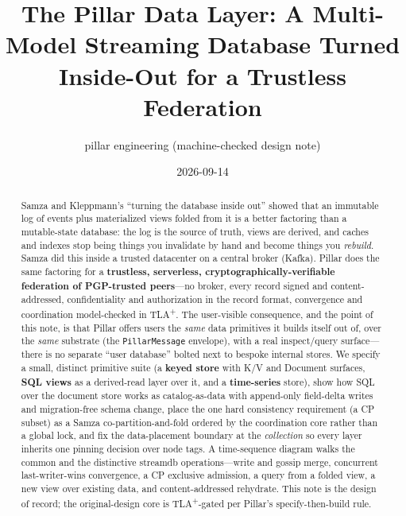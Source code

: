 \documentclass[10pt,twocolumn]{article}
\title{\vspace{-3.5em}\bfseries The Pillar Data Layer: A Multi-Model Streaming
Database Turned Inside-Out for a Trustless Federation}
\author{\normalsize pillar engineering \quad(machine-checked design note)}
\date{\normalsize 2026-09-14}
\newcommand{\code}[1]{\texttt{\small #1}}
\begin{document}
\maketitle

\begin{abstract}
\noindent
Samza and Kleppmann's ``turning the database inside out'' showed that an immutable
log of events plus materialized views folded from it is a better factoring than a
mutable-state database: the log is the source of truth, views are derived, and caches
and indexes stop being things you invalidate by hand and become things you
\emph{rebuild}. Samza did this inside a trusted datacenter on a central broker
(Kafka). Pillar does the same factoring for a \textbf{trustless, serverless,
cryptographically-verifiable federation of PGP-trusted peers}---no broker, every
record signed and content-addressed, confidentiality and authorization in the record
format, convergence and coordination model-checked in TLA\textsuperscript{+}. The
user-visible consequence, and the point of this note, is that Pillar offers users the
\emph{same} data primitives it builds itself out of, over the \emph{same} substrate
(the \code{PillarMessage} envelope), with a real inspect/query surface---there is no
separate ``user database'' bolted next to bespoke internal stores. We specify a small,
distinct primitive suite (a \textbf{keyed store} with K/V and Document surfaces,
\textbf{SQL views} as a derived-read layer over it, and a \textbf{time-series}
store), show how SQL over the document store works as catalog-as-data with
append-only field-delta writes and migration-free schema change, place the one hard
consistency requirement (a CP subset) as a Samza co-partition-and-fold ordered by the
coordination core rather than a global lock, and fix the data-placement boundary at
the \emph{collection} so every layer inherits one pinning decision over node tags. A
time-sequence diagram walks the common and the distinctive streamdb operations---write
and gossip merge, concurrent last-writer-wins convergence, a CP exclusive admission,
a query from a folded view, a new view over existing data, and content-addressed
rehydrate. This note is the design of record; the original-design core is
TLA\textsuperscript{+}-gated per Pillar's specify-then-build rule.
\end{abstract}
\end{document}
